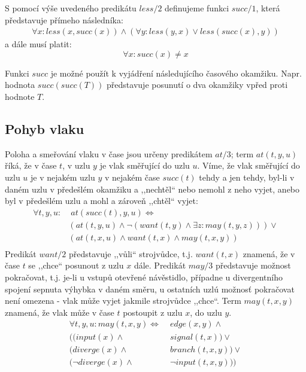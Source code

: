 \documentclass[a4paper,journal]{IEEEtran}
\begin{document}
S pomocí výše uvedeného predikátu $less/2$ definujeme funkci $succ/1$, která představuje přímeho následníka:
\begin{equation}
\begin{split}
\forall x:less\left(x,succ\left(x\right)\right) \wedge
\left(\forall y:less\left(y,x\right) \vee 
less\left(succ\left(x\right),y\right)\right)
\end{split}
\end{equation}
a dále musí platit:
\begin{equation}
\forall x: succ(x) \not = x
\end{equation}

Funkci $succ$ je možné použít k vyjádření následujícího časového okamžiku.
Napr. hodnota $succ(succ(T))$ představuje posunutí o dva okamžiky vpřed proti hodnote $T$.

\subsection{Pohyb vlaku}
Poloha a smeřování vlaku v čase jsou určeny predikátem $at/3$; term $at(t,y,u)$ říká, že v čase $t$, v uzlu $y$ je vlak směřující do
uzlu $u$. Víme, že vlak směřující do uzlu $u$ je v nejakém uzlu $y$ v nejakém čase $succ(t)$ tehdy a jen tehdy, byl-li v daném uzlu
v předešlém okamžiku a ,,nechtěl`` nebo nemohl z neho vyjet, anebo byl v předešlém uzlu a mohl a zároveň ,,chtěl`` vyjet:
\begin{equation}\label{eq:move}
\begin{split}
\forall t,y,u:&\; at\left(succ(t),y,u\right) \Leftrightarrow\\
&(at(t,y,u) \wedge \neg (want(t,y) \wedge \exists z:may(t,y,z))) \vee\\
&(at(t,x,u) \wedge want(t,x) \wedge may(t,x,y))\\ 
\end{split}
\end{equation}
Predikát $want/2$ představuje ,,vůli`` strojvůdce, t.j. $want(t,x)$ znamená, že v čase $t$ se ,,chce`` posunout z uzlu $x$ dále.
Predikát $may/3$ představuje možnost pokračovat, t.j. je-li u vstupů otevřené návěstidlo, případne u divergentního spojení sepnuta výhybka v daném směru, u ostatních uzlú možnosť pokračovat není omezena - 
vlak může vyjet jakmile strojvůdce ,,chce``.
Term $may(t,x,y)$ znamená, že vlak může v čase $t$ postoupit z uzlu $x$, do uzlu $y$. 
\begin{equation}
\begin{split}
\forall t,y,u: may(t,x,y) \Leftrightarrow &\; edge(x,y) \wedge \\
( (input(x) \wedge &\; signal(t,x) ) \vee \\
(diverge(x) \wedge &\; branch(t,x,y)) \vee \\
(\neg diverge(x) \wedge &\; \neg input(t,x,y) ))
\end{split}
\end{equation}
\end{document}
